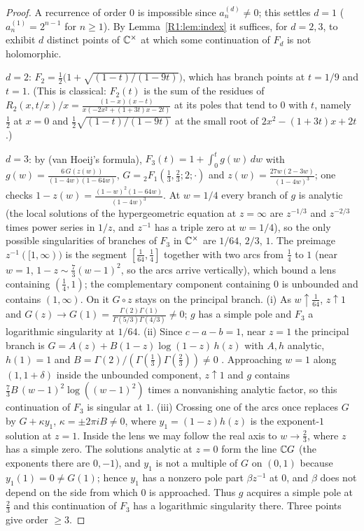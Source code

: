 \documentclass[11pt]{amsart}
\theoremstyle{definition}
\theoremstyle{remark}
\begin{document}
\begin{proof}
A recurrence of order $0$ is impossible since $a^{(d)}_n\neq0$; this settles $d=1$
($a^{(1)}_n=2^{n-1}$ for $n\ge1$). By Lemma~\ref{R1:lem:index} it suffices, for $d=2,3$, to
exhibit $d$ distinct points of $\mathbb{C}^\times$ at which some continuation of $F_d$ is not
holomorphic.

$d=2$: $F_2=\frac12\bigl(1+\sqrt{(1-t)/(1-9t)}\bigr)$, which has branch points at $t=1/9$ and
$t=1$. (This is classical: $F_2(t)$ is the sum of the residues of
$R_2(x,t/x)/x=\frac{(1-x)(x-t)}{x(-2x^2+(1+3t)x-2t)}$ at its poles that tend to $0$ with $t$,
namely $\frac12$ at $x=0$ and $\frac12\sqrt{(1-t)/(1-9t)}$ at the small root of
$2x^2-(1+3t)x+2t$.)

$d=3$: by \cite{R1-BCvHP} (van Hoeij's formula),
$F_3(t)=1+\int_0^t g(w)\,dw$ with $g(w)=\frac{6\,G(z(w))}{(1-4w)(1-64w)}$,
$G={}_2F_1(\frac13,\frac23;2;\cdot)$ and $z(w)=\frac{27w(2-3w)}{(1-4w)^3}$; one checks
$1-z(w)=\frac{(1-w)^2(1-64w)}{(1-4w)^3}$. At $w=1/4$ every branch of $g$ is analytic
(the local solutions of the hypergeometric equation at $z=\infty$ are $z^{-1/3}$ and
$z^{-2/3}$ times power series in $1/z$, and $z^{-1}$ has a triple zero at $w=1/4$), so the
only possible singularities of branches of $F_3$ in $\mathbb{C}^\times$ are $1/64$, $2/3$, $1$.
The preimage $z^{-1}([1,\infty))$ is the segment $[\frac1{64},\frac14]$ together with two arcs
from $\frac14$ to $1$ (near $w=1$, $1-z\sim\frac73(w-1)^2$, so the arcs arrive vertically),
which bound a lens containing $(\frac14,1)$; the complementary component containing $0$ is
unbounded and contains $(1,\infty)$. On it $G\circ z$ stays on the principal branch.
(i) As $w\uparrow\frac1{64}$, $z\uparrow1$ and $G(z)\to G(1)=\frac{\Gamma(2)\Gamma(1)}
{\Gamma(5/3)\Gamma(4/3)}\neq0$; $g$ has a simple pole and $F_3$ a logarithmic singularity at
$1/64$. (ii) Since $c-a-b=1$, near $z=1$ the principal branch is
$G=A(z)+B(1-z)\log(1-z)\,h(z)$ with $A,h$ analytic, $h(1)=1$ and
$B=\Gamma(2)/(\Gamma(\frac13)\Gamma(\frac23))\neq0$ \cite[15.8.10]{R1-DLMF}. Approaching
$w=1$ along $(1,1+\delta)$ inside the unbounded component, $z\uparrow1$ and $g$ contains
$\frac73 B\,(w-1)^2\log((w-1)^2)$ times a nonvanishing analytic factor, so this
continuation of $F_3$ is singular at $1$. (iii) Crossing one of the arcs once replaces $G$
by $G+\kappa y_1$, $\kappa=\pm2\pi iB\neq0$, where $y_1=(1-z)h(z)$ is the exponent-$1$
solution at $z=1$. Inside the lens we may follow the real axis to $w\to\frac23$, where $z$
has a simple zero. The solutions analytic at $z=0$ form the line $\mathbb{C} G$ (the exponents
there are $0,-1$), and $y_1$ is not a multiple of $G$ on $(0,1)$ because $y_1(1)=0\neq G(1)$;
hence $y_1$ has a nonzero pole part $\beta z^{-1}$ at $0$, and $\beta$ does not depend on the
side from which $0$ is approached. Thus $g$ acquires a simple pole at $\frac23$ and this
continuation of $F_3$ has a logarithmic singularity there. Three points give order $\ge3$.
\end{proof}
\end{document}
